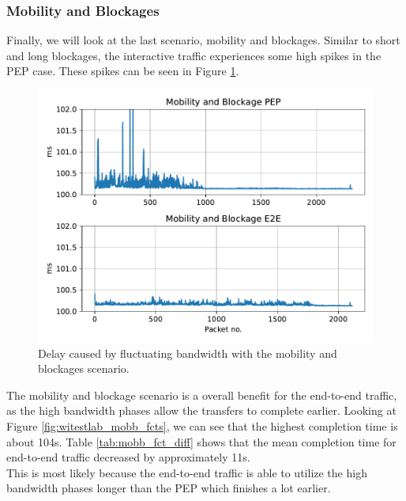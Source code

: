 \documentclass[a4paper,english, 11pt]{report}
\begin{document}
\subsubsection{Mobility and Blockages}

Finally, we will look at the last scenario, mobility and blockages. Similar to short and long blockages, the interactive traffic experiences some high spikes in the PEP case. These spikes can be seen in Figure \ref{fig:witestlab_graph_delay_mobb}. \\

\begin{figure}[h!] %
	\centering
	\includegraphics[scale=0.50]{../diagrams/witestlab/mobility.pdf}
  	\caption{Delay caused by fluctuating bandwidth with the mobility and blockages scenario.}
  	\label{fig:witestlab_graph_delay_mobb}
\end{figure}

The mobility and blockage scenario is a overall benefit for the end-to-end traffic, as the high bandwidth phases allow the transfers to complete earlier. Looking at Figure \ref{fig:witestlab_mobb_fcts}, we can see that the highest completion time is about 104s. Table \ref{tab:mobb_fct_diff} shows that the mean completion time for end-to-end traffic decreased by approximately 11s.\\

This is most likely because the end-to-end traffic is able to utilize the high bandwidth phases longer than the PEP which finishes a lot earlier.
\end{document}
